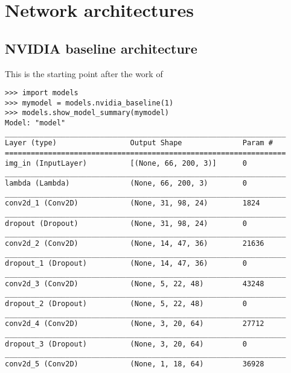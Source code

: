 \chapter{Network architectures} %

\label{AppendixB} %
\section{NVIDIA baseline architecture}
\label{NVIDIA_baseline}
\label{arc:nvidia_baseline}

This is the starting point after the work of \cite{bojarski2016end}

\begin{verbatim}
>>> import models
>>> mymodel = models.nvidia_baseline(1)
>>> models.show_model_summary(mymodel)
Model: "model"
_________________________________________________________________
Layer (type)                 Output Shape              Param #   
=================================================================
img_in (InputLayer)          [(None, 66, 200, 3)]      0         
_________________________________________________________________
lambda (Lambda)              (None, 66, 200, 3)        0         
_________________________________________________________________
conv2d_1 (Conv2D)            (None, 31, 98, 24)        1824      
_________________________________________________________________
dropout (Dropout)            (None, 31, 98, 24)        0         
_________________________________________________________________
conv2d_2 (Conv2D)            (None, 14, 47, 36)        21636     
_________________________________________________________________
dropout_1 (Dropout)          (None, 14, 47, 36)        0         
_________________________________________________________________
conv2d_3 (Conv2D)            (None, 5, 22, 48)         43248     
_________________________________________________________________
dropout_2 (Dropout)          (None, 5, 22, 48)         0         
_________________________________________________________________
conv2d_4 (Conv2D)            (None, 3, 20, 64)         27712     
_________________________________________________________________
dropout_3 (Dropout)          (None, 3, 20, 64)         0         
_________________________________________________________________
conv2d_5 (Conv2D)            (None, 1, 18, 64)         36928     

\end{verbatim}
